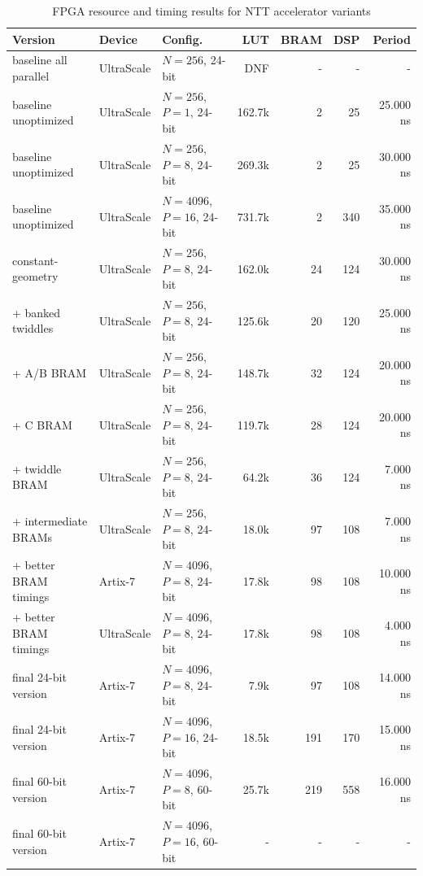 \documentclass[a4paper, 12pt, titlepage]{article}
\begin{document}
\begin{table}[H]
\centering
\scriptsize
\setlength{\tabcolsep}{3pt}
\renewcommand{\arraystretch}{1.12}
\caption{FPGA resource and timing results for NTT accelerator variants}
\label{tab:fpga-variant-results}
\begin{tabularx}{\textwidth}{|l|l|Y|r|r|r|r|}
\hline
\textbf{Version} & \textbf{Device} & \textbf{Config.} & \textbf{LUT} & \textbf{BRAM} & \textbf{DSP} & \textbf{Period} \\
\hline
baseline all parallel & UltraScale & $N=256$, 24-bit & DNF & - & - & - \\
\hline
baseline unoptimized & UltraScale & $N=256$, $P=1$, 24-bit & 162.7k & 2 & 25 & 25.000 ns \\
\hline
baseline unoptimized & UltraScale & $N=256$, $P=8$, 24-bit & 269.3k & 2 & 25 & 30.000 ns \\
\hline
baseline unoptimized & UltraScale & $N=4096$, $P=16$, 24-bit & 731.7k & 2 & 340 & 35.000 ns \\
\hline
constant-geometry & UltraScale & $N=256$, $P=8$, 24-bit & 162.0k & 24 & 124 & 30.000 ns \\
\hline
+ banked twiddles & UltraScale & $N=256$, $P=8$, 24-bit & 125.6k & 20 & 120 & 25.000 ns \\
\hline
+ A/B BRAM & UltraScale & $N=256$, $P=8$, 24-bit & 148.7k & 32 & 124 & 20.000 ns \\
\hline
+ C BRAM & UltraScale & $N=256$, $P=8$, 24-bit & 119.7k & 28 & 124 & 20.000 ns \\
\hline
+ twiddle BRAM & UltraScale & $N=256$, $P=8$, 24-bit & 64.2k & 36 & 124 & 7.000 ns \\
\hline
+ intermediate BRAMs & UltraScale & $N=256$, $P=8$, 24-bit & 18.0k & 97 & 108 & 7.000 ns \\
\hline
+ better BRAM timings & Artix-7 & $N=4096$, $P=8$, 24-bit & 17.8k & 98 & 108 & 10.000 ns \\
\hline
+ better BRAM timings & UltraScale & $N=4096$, $P=8$, 24-bit & 17.8k & 98 & 108 & 4.000 ns \\
\hline
\hline
final 24-bit version & Artix-7 & $N=4096$, $P=8$, 24-bit & 7.9k & 97 & 108 & 14.000 ns \\
\hline
final 24-bit version & Artix-7 & $N=4096$, $P=16$, 24-bit & 18.5k & 191 & 170 & 15.000 ns \\
\hline
final 60-bit version & Artix-7 & $N=4096$, $P=8$, 60-bit & 25.7k & 219 & 558 & 16.000 ns \\
\hline
final 60-bit version & Artix-7 & $N=4096$, $P=16$, 60-bit & - & - & - & - \\

\end{tabularx}
\end{table}
\end{document}
